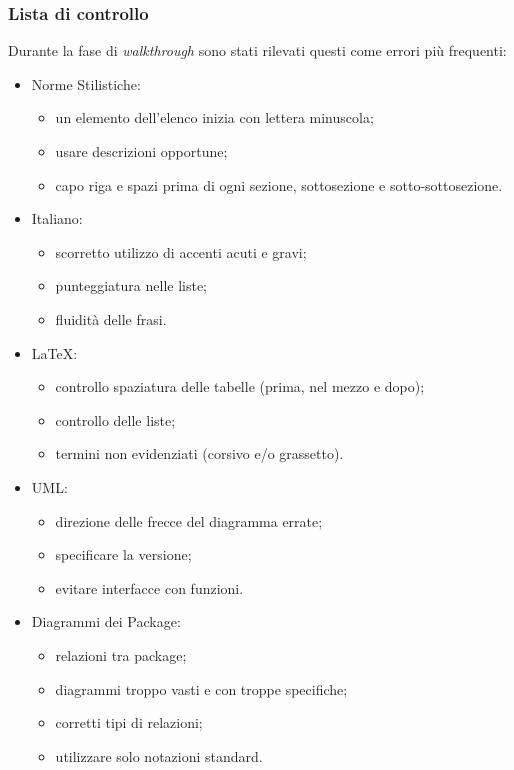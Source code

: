 \documentclass[12pt,a4paper,titlepage]{article}
\begin{document}
		\subsubsection{Lista di controllo}	%
Durante la fase di \textit{walkthrough} sono stati rilevati questi come errori più frequenti:
\begin{itemize}
\item Norme Stilistiche:
	\begin{itemize}
		\item un elemento dell'elenco inizia con lettera minuscola;
		\item usare descrizioni opportune;
		\item capo riga e spazi prima di ogni sezione, sottosezione e sotto-sottosezione.
	\end{itemize}
\item Italiano:
	\begin{itemize}
		\item scorretto utilizzo di accenti acuti e gravi;
		\item punteggiatura nelle liste;
		\item fluidità delle frasi.
	\end{itemize}
\item \LaTeX:
	\begin{itemize}
		\item controllo spaziatura delle tabelle (prima, nel mezzo e dopo);
		\item controllo delle liste;
		\item termini non evidenziati (corsivo e/o grassetto).
	\end{itemize}
\item UML:
	\begin{itemize}
		\item direzione delle frecce del diagramma errate;
		\item specificare la versione;
		\item evitare interfacce con funzioni.
	\end{itemize}
\item Diagrammi dei Package:	
	\begin{itemize}
		\item relazioni tra package;
		\item diagrammi troppo vasti e con troppe specifiche;
		\item corretti tipi di relazioni;
		\item utilizzare solo notazioni standard.
	\end{itemize}

\end{itemize}
\end{document}
